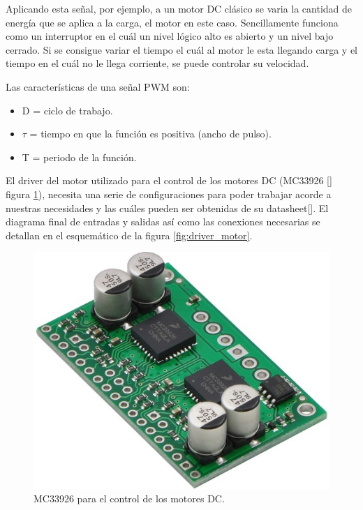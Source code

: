 Aplicando esta señal, por ejemplo, a un motor DC clásico se varia la cantidad de energía que se aplica a la carga, el motor en este caso. Sencillamente funciona como un interruptor en el cuál un nivel lógico alto es abierto y un nivel bajo cerrado. Si se consigue variar el tiempo el cuál al motor le esta llegando carga y el tiempo en el cuál no le llega corriente, se puede controlar su velocidad. \newline

Las características de una señal PWM son: 
\begin{itemize}
	\item D = ciclo de trabajo.
	\item $\tau$ = tiempo en que la función es positiva (ancho de pulso).
	\item T = periodo de la función.
\end{itemize}


El driver del motor utilizado para el control de los motores DC (MC33926 [] figura \ref{fig:driver_motor_fisico}), necesita una serie de configuraciones para poder trabajar acorde a nuestras necesidades y las cuáles pueden ser obtenidas de su datasheet[]. El diagrama final de entradas y salidas así como las conexiones necesarias se detallan en el esquemático de la figura \ref{fig:driver_motor}.


\begin{figure}[H]
	\center
	\includegraphics[trim = 0mm 0cm 0mm 0cm, clip,scale=0.4]{imagenes/Balancing_robot/driver_motor.jpg}
	\caption{MC33926 para el control de los motores DC.}
	\label{fig:driver_motor_fisico}
\end{figure}


